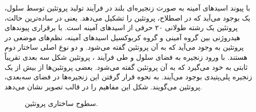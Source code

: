 با پیوند اسیدهای آمینه به صورت زنجیره‌‌ای بلند در فرآیند تولید پروتئین توسط سلول، یک  بوجود می‌آید که در اصطلاح،  پروتئین را تشکیل می‌دهد. یعنی در ساده‌ترین حالت، پروتئین یک رشته طولانی ۲۰ حرفی از اسیدهای آمینه است. با برقراری پیوندهای هیدروژنی بین گروه آمینی و گروه کربوکسیل اسیدهای آمینه، نظم‌های موضعی در پروتئین به وجود می‌آید که به آن‌  پروتئین گفته می‌شود.  و  دو نوع اصلی ساختار دوم هستند. با ورود زنجیره به فضای سلول و طی فرآیند ، پروتئین شکل سه بعدی تقریباً ثابتی به خود می‌گیرد که به آن  پروتئین گفته می‌شود. بعضی پروتئین‌ها از بیش از یک زنجیره پلی‌پتیدی بوجود می‌آیند. به نحوه قرار گرفتن این زنجیره‌ها در فضای سه‌بعدی،  پروتئین می‌گویند. شکل  این مفاهیم را در قالب تصویر نشان می‌دهد.

\begin{figure}[h!]
\caption{
سطوح ساختاری پروتئین.
}
\label{fig:protein}
\end{figure}

